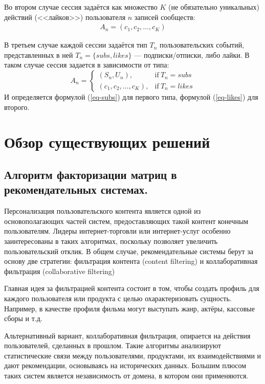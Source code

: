 \documentclass[times,specification,annotation]{itmo-student-thesis}
\begin{document}
Во втором случае сессия задаётся как множество $K$ (не обязательно уникальных) действий (<<лайков>>) пользователя $n$ записей сообществ:
 \begin{align}
A_n = (c_{1}, c_{2}, \dots, c_{K}) 
\label{eq-likes}
\end{align}
 
В третьем случае каждой сессии задаётся тип $T_n$ пользовательских событий, представленных в ней $T_n = \{subs, likes\}$ --- подписки/отписки, либо лайки. В таком случае сессия задается в зависимости от типа:
\begin{equation}
    A_n =
    \begin{cases}
      (S_n, U_n), & \text{if}\ T_n=subs \\
      (c_{1}, c_{2}, \dots, c_{K}), & \text{if}\ T_n=likes
    \end{cases}  
    \label{eq-combined}
  \end{equation}
 И определяется формулой (\ref{eq-subs}) для первого типа, формулой (\ref{eq-likes}) для второго.

\section{Обзор существующих решений}

\subsection{Алгоритм факторизации матриц в рекомендательных системах.}\label{sec:als}

Персонализация пользовательского контента является одной из основополагающих частей систем, предоставляющих такой контент конечным пользователям. Лидеры интернет-торговли или интернет-услуг особенно заинтересованы в таких алгоритмах, поскольку позволяет увеличить пользовательский отклик.
В общем случае, рекомендательные системы берут за основу две стратегии: фильтрация контента (content filtering) \cite{Lops2011,} и коллаборативная фильтрация (collaborative filtering)
  
Главная идея за фильтрацией контента состоит в том, чтобы создать профиль для каждого пользователя или продукта с целью охарактеризовать сущность. Например, в качестве профиля фильма могут выступать жанр, актёры, кассовые сборы и т.д.

Альтернативный вариант, коллаборативная фильтрация, опирается на действия пользователей, сделанных в прошлом. Такие алгоритмы анализируют статистические связи между пользователями, продуктами, их взаимодействиями и дают рекомендации, основываясь на исторических данных.  Большим плюсом таких систем является независимость от домена, в котором они применяются.
\end{document}
